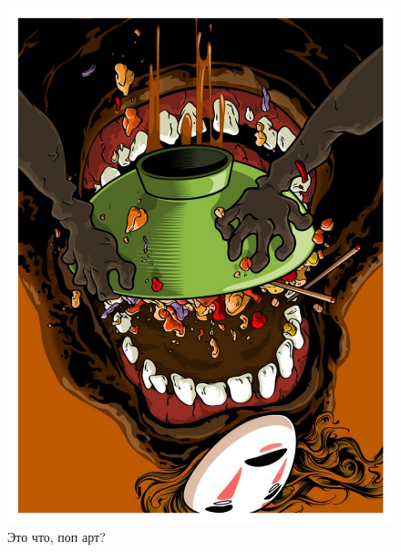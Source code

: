 \documentclass[12pt, a4paper]{article}
\begin{document}
\begin{figure}[h!]
\begin{minipage}[h!]{0.28\linewidth}
\end{minipage}
\hfill
\begin{minipage}[h!]{0.28\linewidth} 
\includegraphics[scale=0.18,angle=180]{pop6.pdf}
\end{minipage}
\caption{Это что, поп арт?}
\end{figure}
\end{document}
